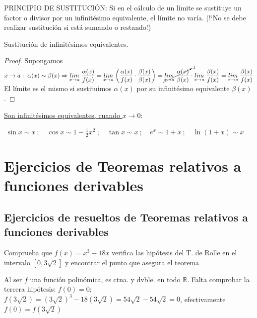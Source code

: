 	
		 \begin{teor}{PRINCIPIO DE SUSTITUCIÓN}: Si en el cálculo de un límite se sustituye un factor o divisor por un infinitésimo equivalente, el límite no varía. (!`No se debe realizar sustitución si está sumando o restando!)
		 
		
		 \end{teor} Sustitución de infinitésimos equivalentes.
		 
	
		 
		 \begin{proof}
		 Supongamos $x\to a: \; \alpha (x) \sim \beta (x) \Rightarrow \underset {x\to a}{lim }\; { \dfrac {\alpha (x)}{ f(x) } }= \underset {x\to a}{lim }\;  
		 {\left(  \dfrac {\alpha (x)}{ f(x) } \cdot \dfrac {\beta (x)}{ \beta (x) } \right)}=  
		 \cancelto{1}{\underset {x\to a}{lim }\; { \dfrac {\alpha (x)}{ \beta (x) } } }
		 \cdot \underset {x\to a}{lim }\; { \dfrac {\beta (x)}{ f(x) } } =\underset {x\to a}{lim }\; { \dfrac {\beta (x)} {f(x)}}$ El límite es el mismo si sustituimos $\alpha (x)$ por su infinitésimo equivalente $\beta (x)$.
		 \end{proof}
		 

		\underline{Son infinitésimos equivalentes, cuando $x\to 0$}:
		 
		
		$\boxed{ \; \sin x \sim x\:; \quad \cos x \sim 1 - \frac 1 2 x^2\:; \quad \tan x \sim x\:; \quad e^x	 \sim 1 + x\:; \quad \ln (1+x) \sim x \; }$ 



	
\section{Ejercicios de Teoremas relativos a funciones derivables} 

\subsection{Ejercicios de resueltos de Teoremas relativos a funciones derivables}

	\begin{ejre} Comprueba que $f(x)=x^3-18x$ verifica las hipótesis del T. de Rolle en el intervalo $[0,3\sqrt{2}]$ y encontrar el punto que asegura el teorema
		
	\end{ejre}
	\begin{proofw}\renewcommand{\qedsymbol}{$\diamond$}	
		
		Al ser $f$ una función polinómica, es ctna. y dvble. en todo $\mathbb R$. Falta comprobar la tercera hipótesis: $f(0)=0$; $f(3\sqrt{2})=(3\sqrt{2})^3-18(3\sqrt{2})=54\sqrt{2}-54\sqrt{2}=0$, efectivamente $f(0)=f(3\sqrt{2})$
	\end{proofw}
	
